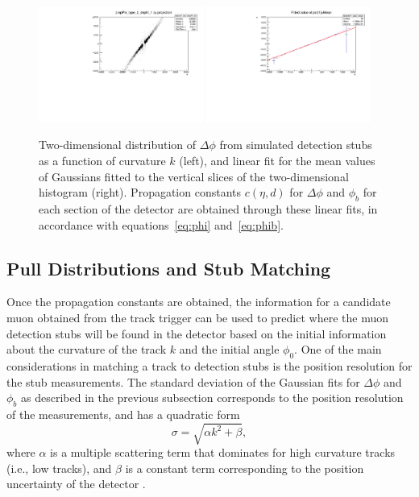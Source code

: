 \begin{figure}[htbp] %
  \centering
  \includegraphics[width=0.48\textwidth]{fig/TPS/deltaPhi_2D.pdf}
  \includegraphics[width=0.48\textwidth]{fig/TPS/deltaPhi_mean.pdf}
  \caption{Two-dimensional distribution of $\Delta\phi$ from simulated detection stubs as a function of curvature $k$ (left), and linear fit for the mean values of Gaussians fitted to the vertical slices of the two-dimensional histogram (right). Propagation constants $c(\eta,d)$ for $\Delta\phi$ and $\phi_b$ for each section of the detector are obtained through these linear fits, in accordance with equations~\ref{eq:phi} and~\ref{eq:phib}.}
  \label{fig:deltaPhiHist}
\end{figure}

\subsection{Pull Distributions and Stub Matching}
\label{subsec:pulls}

Once the propagation constants are obtained, the information for a candidate muon obtained from the track trigger can be used to predict where the muon detection stubs will be found in the detector based on the initial information about the curvature of the track $k$ and the initial angle $\phi_0$.
One of the main considerations in matching a track to detection stubs is the position resolution for the stub measurements.
The standard deviation of the Gaussian fits for $\Delta\phi$ and $\phi_b$ as described in the previous subsection corresponds to the position resolution of the measurements, and has a quadratic form
\begin{equation}
  \sigma=\sqrt{\alpha k^2+\beta},
\end{equation}
where $\alpha$ is a multiple scattering term that dominates for high curvature tracks (i.e., low \pt tracks), and $\beta$ is a constant term corresponding to the position uncertainty of the detector \cite{PhysRevD.98.030001}.

